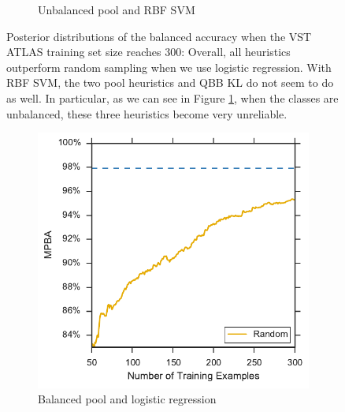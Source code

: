 \begin{figure}[p]
\begin{subfigure}{\textwidth}
		\caption{Unbalanced pool and RBF SVM}
		\label{fig:vstatlas_ur_ind_violin}
	\end{subfigure}
	\caption[Violin plots of balanced accuracy (VST ATLAS)]{
		Posterior distributions of the balanced accuracy when the VST ATLAS training set size reaches 300: Overall, all heuristics outperform random sampling when we use logistic regression. With RBF SVM, the two pool heuristics and QBB KL do not seem to do as well.
		In particular, as we can see in Figure \ref{fig:vstatlas_ur_ind_violin}, when the classes are unbalanced, these three heuristics become very unreliable.}
	\label{fig:vstatlas_bl_ind}
\end{figure}


\begin{figure}[p]
	\centering
	\begin{subfigure}{.5\textwidth}
		\centering
		\includegraphics[width=\textwidth]{figures/5_active/vstatlas_bl_ind_lower}
		\caption{Balanced pool and logistic regression}
		\label{fig:vstatlas_bl_ind_lower}
	\end{subfigure}%
	\begin{subfigure}{.5\textwidth}
		\centering

\end{subfigure}
\end{figure}
